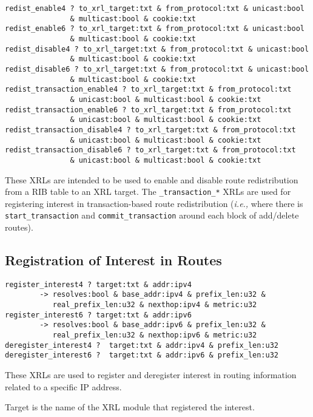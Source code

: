 \documentclass[11pt]{article}
\newcommand{\ie}{\emph{i.e.,}\xspace}
\begin{document}
\begin{verbatim}
redist_enable4 ? to_xrl_target:txt & from_protocol:txt & unicast:bool
               & multicast:bool & cookie:txt
redist_enable6 ? to_xrl_target:txt & from_protocol:txt & unicast:bool
               & multicast:bool & cookie:txt
redist_disable4 ? to_xrl_target:txt & from_protocol:txt & unicast:bool
               & multicast:bool & cookie:txt
redist_disable6 ? to_xrl_target:txt & from_protocol:txt & unicast:bool
               & multicast:bool & cookie:txt
redist_transaction_enable4 ? to_xrl_target:txt & from_protocol:txt
               & unicast:bool & multicast:bool & cookie:txt
redist_transaction_enable6 ? to_xrl_target:txt & from_protocol:txt
               & unicast:bool & multicast:bool & cookie:txt
redist_transaction_disable4 ? to_xrl_target:txt & from_protocol:txt
               & unicast:bool & multicast:bool & cookie:txt
redist_transaction_disable6 ? to_xrl_target:txt & from_protocol:txt
               & unicast:bool & multicast:bool & cookie:txt
\end{verbatim}

These XRLs are intended to be used to enable and disable route
redistribution from a RIB table to an XRL target.
The {\tt *\_transaction\_*} XRLs are used for registering interest in
transaction-based route redistribution (\ie where there is
{\tt start\_transaction} and {\tt commit\_transaction} around each block
of add/delete routes).

\subsection{Registration of Interest in Routes}
\label{reg}

\begin{verbatim}
register_interest4 ? target:txt & addr:ipv4 
        -> resolves:bool & base_addr:ipv4 & prefix_len:u32 & 
           real_prefix_len:u32 & nexthop:ipv4 & metric:u32
register_interest6 ? target:txt & addr:ipv6 
        -> resolves:bool & base_addr:ipv6 & prefix_len:u32 & 
           real_prefix_len:u32 & nexthop:ipv6 & metric:u32
deregister_interest4 ?  target:txt & addr:ipv4 & prefix_len:u32
deregister_interest6 ?  target:txt & addr:ipv6 & prefix_len:u32
\end{verbatim}

These XRLs are used to register and deregister interest in routing
information related to a specific IP address. 

Target is the name of the XRL module that registered the interest.
\end{document}

